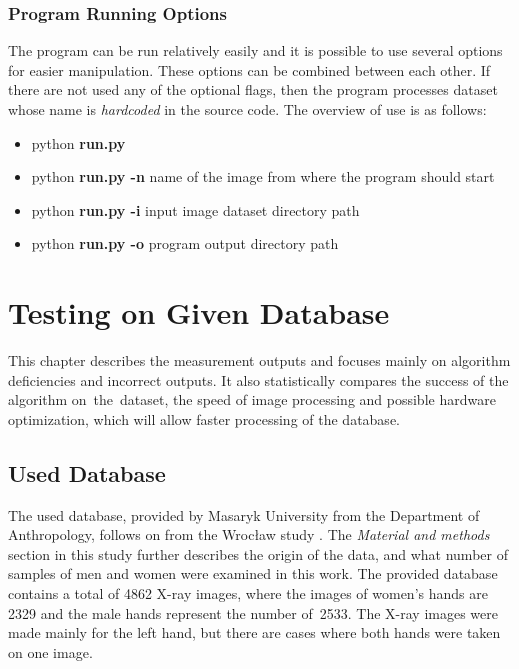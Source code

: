 \subsection{Program Running Options}
The program can be run relatively easily and it is possible to use several options for easier manipulation. These options can be combined between each other. If there are not used any of the optional flags, then the program processes dataset whose name is \textit{hardcoded} in the source code. The overview of use is as follows:

\begin{itemize}
    \item python \textbf{run.py}
    \item python \textbf{run.py -n} name of the image from where the program should start
    \item python \textbf{run.py -i} input image dataset directory path
    \item python \textbf{run.py -o} program output directory path
\end{itemize}


\chapter{Testing on Given Database}
\label{testing}
This chapter describes the measurement outputs and focuses mainly on algorithm deficiencies and incorrect outputs. It also statistically compares the success of the algorithm on~the~dataset, the speed of image processing and possible hardware optimization, which will allow faster processing of the database.

\section{Used Database}
The used database, provided by Masaryk University from the Department of Anthropology, follows on from the Wrocław study \cite{wroclaw}. The \textit{Material and methods} section in this study further describes the origin of the data, and what number of samples of men and women were examined in this work. The provided database contains a total of 4862 X-ray images, where the images of women's hands are 2329 and the male hands represent the number of~2533. The X-ray images were made mainly for the left hand, but there are cases where both hands were taken on one image.

